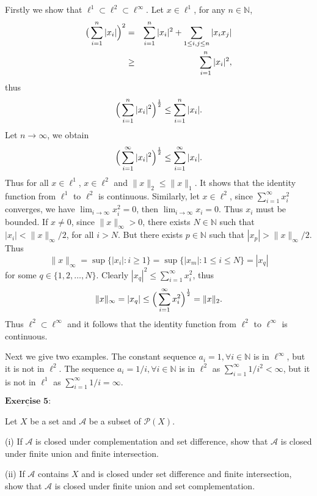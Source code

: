 \documentclass[12pt,a4paper]{ctexart}
\begin{document}
Firstly we show that $\ell^1 \subset \ell^2 \subset \ell^{\infty}$. Let $x \in \ell^1$, for any $n \in \mathbb N$,
\begin{eqnarray*}
 \big{(} \sum_{i=1}^{n} |x_i| \Big{)}^2 & = & \sum_{i=1}^{n} |x_i|^2 + \sum_{1 \leq i, j \leq n} |x_i x_j| \\
    & \geq & \sum_{i=1}^{n} |x_i|^2,
\end{eqnarray*}
thus 
$$\Big{(} \sum_{i=1}^{n} |x_i|^2 \Big{)}^{\frac{1}{2}} \leq \sum_{i=1}^{n} |x_i|.$$
Let $n \to \infty$, we obtain
$$\Big{(} \sum_{i=1}^{\infty} |x_i|^2 \Big{)}^{\frac{1}{2}} \leq \sum_{i=1}^{\infty} |x_i|.$$
Thus for all $x \in \ell^1$, $x \in \ell^2$ and $\|x\|_2 \leq \|x\|_1$. It shows that the identity function from $\ell^1$ to $\ell^2$ is continuous. Similarly, let $x \in \ell^2$, since $\sum_{i = 1}^{\infty} x_i^2$ converges, we have $\lim_{i \to \infty} x_i^2 = 0$, then $\lim_{i \to \infty} x_i = 0$. Thus $x_i$ must be bounded. If $x \neq 0$, since $\|x\|_{\infty} > 0$, there exists $N \in \mathbb N$ such that $|x_i| < \|x\|_{\infty} /2$, for all $i > N$. But there exists $p \in \mathbb N$ such that $|x_p| > \|x\|_{\infty} / 2$. Thus 
$$\|x\|_{\infty} = \sup \{|x_i| : i \geq 1\} = \sup \{|x_m|:1 \leq i \leq N \} = |x_q|$$
for some $q \in \{1, 2, \dots, N\}$. Clearly $|x_q|^2 \leq \sum_{i=1}^{\infty} x_i^2$, thus
$$\|x\|_{\infty} = |x_q| \leq \Big{(} \sum_{i=1}^{\infty} x_i^2 \Big{)}^{\frac{1}{2}} = \|x\|_2.$$ 
Thus $\ell^2 \subset \ell^{\infty}$ and it follows that the identity function from $\ell^2$ to $\ell^{\infty}$ is continuous.

Next we give two examples. The constant sequence $a_i = 1, \forall i \in \mathbb N$ is in $\ell^{\infty}$, but it is not in $\ell^2$. The sequence $a_i = 1/i, \forall i \in \mathbb N$  is in $\ell^2$ as $\sum_{i = 1}^{\infty} 1/i^2 < \infty$, but it is not in $\ell^1$ as $\sum_{i = 1}^{\infty} 1/i = \infty$.


\newpage

$\underline{\textbf{Exercise 5:}}$

Let $X$ be a set and $\mathcal A$ be a subset of $\mathcal P(X)$.

(i) If $\mathcal A$ is closed under complementation and set difference, show that $\mathcal A$ is closed under finite union and finite intersection.

(ii) If $\mathcal A$ contains $X$ and is closed under set difference and finite intersection, show that $\mathcal A$ is closed under finite union and set complementation.
\end{document}
